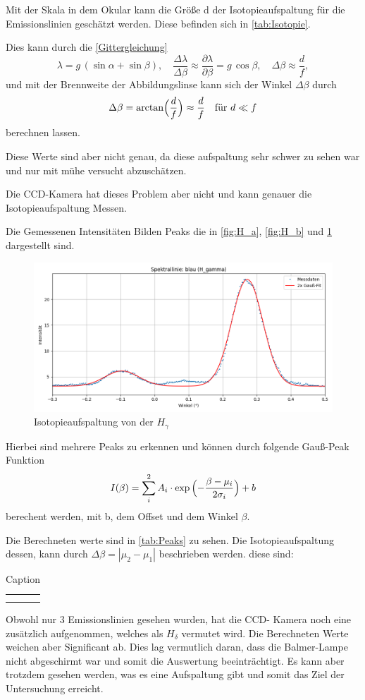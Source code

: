 Mit der Skala in dem Okular kann die Größe d der Isotopieaufspaltung für die Emissionslinien geschätzt werden. 
Diese befinden sich in \cref{tab:Isotopie}.

Dies kann durch die \cref{Gittergleichung}
\begin{equation}
  \lambda = g\,(\sin\alpha + \sin\beta),
  \quad
\frac{\Delta\lambda}{\Delta\beta} \approx 
  \frac{\partial\lambda}{\partial\beta} = g\,\cos\beta,
  \quad
  \Delta\beta \approx \frac{d}{f},
\end{equation}
und mit der Brennweite der Abbildungslinse kann sich der Winkel $\Delta\beta$ durch 
\begin{equation}
    \Delta\beta = \arctan\Bigl(\frac{d}{f}\Bigr) \approx \frac{d}{f} \quad \text{für } d \ll f
\end{equation}
berechnen lassen.

Diese Werte sind aber nicht genau, da diese aufspaltung sehr schwer zu sehen war und nur mit mühe versucht abzuschätzen.

Die CCD-Kamera hat dieses Problem aber nicht und kann genauer die Isotopieaufspaltung Messen.

Die Gemessenen Intensitäten Bilden Peaks die in \cref{fig:H_a}, \cref{fig:H_b} und \cref{fig:H_g} dargestellt sind. 
\begin{figure}
    \centering
    \includegraphics[width=0.5\linewidth]{figs/dt_lila_145_51_5.png}
    \caption{Isotopieaufspaltung von der $H_{\gamma}$}
    \label{fig:H_g}
\end{figure}

Hierbei sind mehrere Peaks zu erkennen und können durch folgende Gauß-Peak Funktion 
\begin{equation}
    I(\beta) = \sum_i^2 A_i \cdot \exp{\Bigl(-\frac{\beta-\mu_i}{2\sigma_i}}\Bigr) +b
\end{equation}
berechent werden, mit b, dem Offset und dem Winkel $\beta$. 

Die Berechneten werte sind in \cref{tab:Peaks} zu sehen.
Die Isotopieaufspaltung dessen, kann durch 
$\Delta\beta = |\mu_2 - \mu_1|$
beschrieben werden. 
diese sind:
\begin{table}[htbp]
    \centering
    \begin{tabular}{c|c}
         &  \\
         & 
    \end{tabular}
    \caption{Caption}
    \label{tab:my_label}
\end{table}
Obwohl nur 3 Emissionslinien gesehen wurden, hat die CCD- Kamera noch eine zusätzlich aufgenommen, welches als $H_\delta$ vermutet wird.
Die Berechneten Werte weichen aber Significant ab.
Dies lag vermutlich daran, dass die Balmer-Lampe nicht abgeschirmt war und somit die Auswertung beeinträchtigt. 
Es kann aber trotzdem gesehen werden, was es eine Aufspaltung gibt und somit das Ziel der Untersuchung erreicht.

